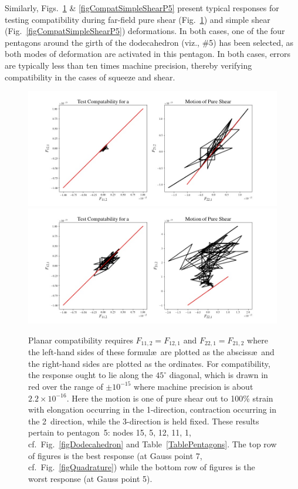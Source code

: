 Similarly, Figs.~\ref{figCompatPureShearP5} \& \ref{figCompatSimpleShearP5} present typical responses for testing compatibility during far-field pure shear (Fig.~\ref{figCompatPureShearP5}) and simple shear (Fig.~\ref{figCompatSimpleShearP5}) deformations.  In both cases, one of the four pentagons around the girth of the dodecahedron (viz., \#5) has been selected, as both modes of deformation are activated in this pentagon.  In both cases, errors are typically less than ten times machine precision, thereby verifying compatibility in the cases of squeeze and shear.

\begin{figure}
	\centering
	\includegraphics[width=\textwidth]{figures/compatibilityPureShearP5G7.jpg}
	\includegraphics[width=\textwidth]{figures/compatibilityPureShearP5G5.jpg}
	\caption{Planar compatibility requires $F_{11,2} = F_{12,1}$ and $F_{22,1} = F_{21,2}$ where the left-hand sides of these formul\ae\ are plotted as the absciss\ae\ and the right-hand sides are plotted as the ordinates.  For compatibility, the response ought to lie along the $45^{\circ}$ diagonal, which is drawn in red over the range of $\pm 10^{-15}$ where machine precision is about $2.2 \times 10^{-16}$.  Here the motion is one of pure shear out to 100\% strain with elongation occurring in the 1-direction, contraction occurring in the 2~direction, while the 3-direction is held fixed.  These results pertain to pentagon~5: nodes 15, 5, 12, 11, 1, cf.\ Fig.~\ref{figDodecahedron} and Table~\ref{TablePentagons}.  The top row of figures is the best response (at Gauss point 7, cf.\ Fig.~\ref{figQuadrature}) while the bottom row of figures is the worst response (at Gauss point 5).}
	\label{figCompatPureShearP5}
\end{figure}


